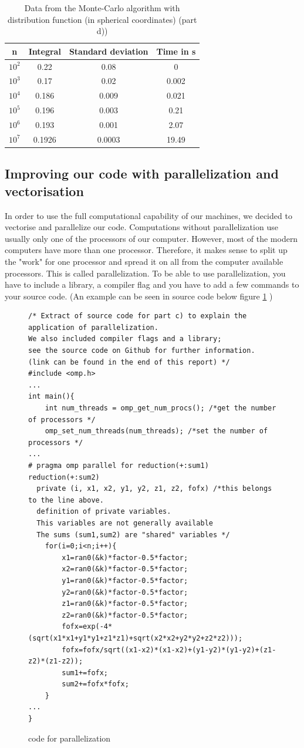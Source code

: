 \documentclass[10pt,a4paper]{article}
\begin{document}
\begin{table}[h]
\centering
\caption{Data from the Monte-Carlo algorithm with distribution function (in spherical coordinates) (part d))}
\label{Data from the  montecarlo algorithm (part d))}
\begin{tabular}{c|c|c|c}
n & Integral & Standard deviation & Time in s \\
\hline\hline
$10^2$ & 0.22 & 0.08 & 0 \\
$10^3$ & 0.17 & 0.02 & 0.002 \\
$10^4$ & 0.186 & 0.009 & 0.021 \\
$10^5$ & 0.196 & 0.003 & 0.21 \\
$10^6$ & 0.193 & 0.001 & 2.07 \\
$10^7$ & 0.1926 & 0.0003 &  19.49
\end{tabular}
\end{table}

\subsection{Improving our code with parallelization and vectorisation}

In order to use the full computational capability of our machines, we decided to vectorise and parallelize our code. Computations without parallelization use usually only one of the processors of our computer. However, most of the modern computers have more than one processor. Therefore, it makes sense to split up the "work" for one processor and spread it on all from the computer available processors. This is called parallelization. To be able to use parallelization, you have to include a library, a compiler flag and you have to add a few commands to your source code. (An example can be seen in source code below figure \ref{code for parallel} )


\begin{figure}[h]
\caption{code for parallelization}
\label{code for parallel}
\begin{lstlisting}
/* Extract of source code for part c) to explain the application of parallelization.
We also included compiler flags and a library; 
see the source code on Github for further information. 
(link can be found in the end of this report) */
#include <omp.h>
...
int main(){
    int num_threads = omp_get_num_procs(); /*get the number of processors */
    omp_set_num_threads(num_threads); /*set the number of processors */
...
# pragma omp parallel for reduction(+:sum1) reduction(+:sum2) 
  private (i, x1, x2, y1, y2, z1, z2, fofx) /*this belongs to the line above. 
  definition of private variables. 
  This variables are not generally available
  The sums (sum1,sum2) are "shared" variables */
    for(i=0;i<n;i++){
        x1=ran0(&k)*factor-0.5*factor;
        x2=ran0(&k)*factor-0.5*factor;
        y1=ran0(&k)*factor-0.5*factor;
        y2=ran0(&k)*factor-0.5*factor;
        z1=ran0(&k)*factor-0.5*factor;
        z2=ran0(&k)*factor-0.5*factor;
        fofx=exp(-4*(sqrt(x1*x1+y1*y1+z1*z1)+sqrt(x2*x2+y2*y2+z2*z2)));
        fofx=fofx/sqrt((x1-x2)*(x1-x2)+(y1-y2)*(y1-y2)+(z1-z2)*(z1-z2));
        sum1+=fofx;
        sum2+=fofx*fofx;
    }
...
}
\end{lstlisting}
\end{figure}
\end{document}
